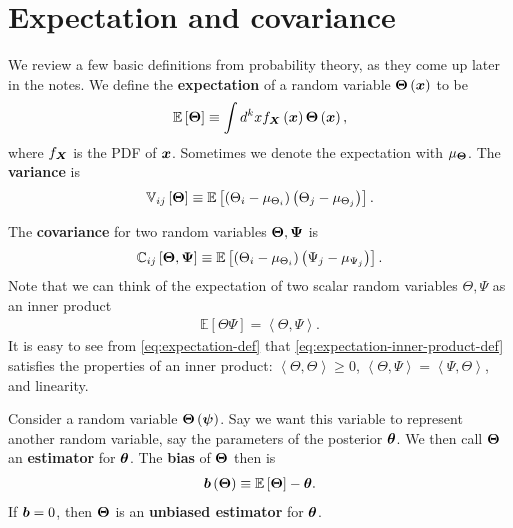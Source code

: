 \section{Expectation and covariance}

We review a few basic definitions from probability theory, as they come
up later in the notes.
We define the \textbf{expectation} of a random variable ${\bm \Theta}\left({\bm x}\right)$ to be
\begin{align}
    \label{eq:expectation-def}
    \mathbb{E}\left[{\bm \Theta}\right]
    \equiv
    \int d^kx f_{{\bm X}}\left({\bm x}\right) {\bm \Theta}\left({\bm x}\right)
    ,
\end{align}
where $f_{{\bm X}}$ is the PDF of ${\bm x}$.
Sometimes we denote the expectation with $\mu_{{\bm \Theta}}$.
The \textbf{variance} is
\begin{align}
    \label{eq:variance-def}
    \mathbb{V}_{ij}\left[{\bm \Theta}\right]
    \equiv
    \mathbb{E}\left[
        \left(\Theta_i-\mu_{\Theta_i}\right)
        \left(\Theta_j-\mu_{\Theta_j}\right)
    \right]
    .
\end{align}

The \textbf{covariance} for two random variables ${\bm \Theta},{\bm \Psi}$ is
\begin{align}
    \label{eq:covariance-def}
    \mathbb{C}_{ij}\left[{\bm \Theta},{\bm \Psi}\right]
    \equiv
    \mathbb{E}\left[
        \left(\Theta_i - \mu_{\Theta_i}\right)
        \left(\Psi_j   - \mu_{\Psi_j}  \right)
    \right]
    .
\end{align}
Note that we can think of the expectation of two scalar random variables $\Theta,\Psi$ as an inner product
\begin{align}
    \label{eq:expectation-inner-product-def}
    \mathbb{E}\left[\Theta\Psi\right]
    =
    \left<\Theta,\Psi\right>
    .
\end{align}
It is easy to see from \eqref{eq:expectation-def} that \eqref{eq:expectation-inner-product-def} satisfies
the properties of an inner product: 
$\left<\Theta,\Theta\right>\geq0$, $\left<\Theta,\Psi\right>=\left<\Psi,\Theta\right>$, and linearity.

Consider a random variable ${\bm \Theta}\left({\bm \psi}\right)$. 
Say we want this variable to represent another random variable, say the parameters of the posterior ${\bm \theta}$.
We then call ${\bm \Theta}$ an \textbf{estimator} for ${\bm \theta}$.
The \textbf{bias} of ${\bm \Theta}$ then is
\begin{align}
    \label{eq:bias-def}
    {\bm b}\left({\bm \Theta}\right)
    \equiv
    \mathbb{E}\left[{\bm \Theta}\right]
    -
    {\bm \theta}
    .
\end{align}
If ${\bm b}=0$, then ${\bm \Theta}$ is an \textbf{unbiased estimator} for ${\bm \theta}$.

